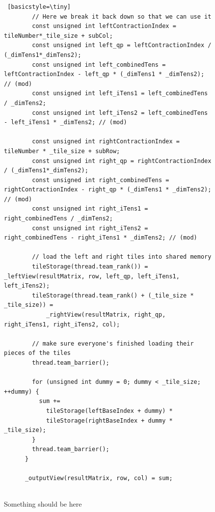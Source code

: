 \begin{figure}[H]
\begin{lstlisting} [basicstyle=\tiny]
        // Here we break it back down so that we can use it
        const unsigned int leftContractionIndex = tileNumber*_tile_size + subCol;
        const unsigned int left_qp = leftContractionIndex / (_dimTens1*_dimTens2);
        const unsigned int left_combinedTens = leftContractionIndex - left_qp * (_dimTens1 * _dimTens2); // (mod)
        const unsigned int left_iTens1 = left_combinedTens / _dimTens2;
        const unsigned int left_iTens2 = left_combinedTens - left_iTens1 * _dimTens2; // (mod)

        const unsigned int rightContractionIndex = tileNumber * _tile_size + subRow; 
        const unsigned int right_qp = rightContractionIndex / (_dimTens1*_dimTens2);
        const unsigned int right_combinedTens = rightContractionIndex - right_qp * (_dimTens1 * _dimTens2); // (mod)
        const unsigned int right_iTens1 = right_combinedTens / _dimTens2;
        const unsigned int right_iTens2 = right_combinedTens - right_iTens1 * _dimTens2; // (mod)

        // load the left and right tiles into shared memory
        tileStorage(thread.team_rank()) = _leftView(resultMatrix, row, left_qp, left_iTens1, left_iTens2);
        tileStorage(thread.team_rank() + (_tile_size * _tile_size)) =
            _rightView(resultMatrix, right_qp, right_iTens1, right_iTens2, col);

        // make sure everyone's finished loading their pieces of the tiles
        thread.team_barrier();

        for (unsigned int dummy = 0; dummy < _tile_size; ++dummy) {
          sum +=
            tileStorage(leftBaseIndex + dummy) *
            tileStorage(rightBaseIndex + dummy * _tile_size);
        }
        thread.team_barrier();
      }
      
      _outputView(resultMatrix, row, col) = sum;
      
 \end{lstlisting}
 \caption{Something should be here} %
\label{lst:CFFTTiling}
\end{figure}
 
 
